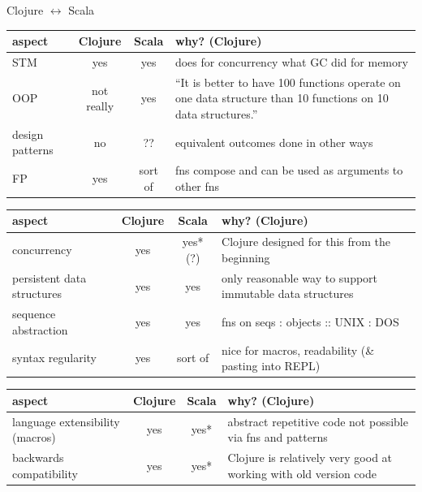 \documentclass{beamer}
\begin{document}
\begin{frame}[allowframebreaks]{Clojure $\leftrightarrow$ Scala}
  \begin{tabularx}{\linewidth}{l || c | c | X}
    aspect & Clojure & Scala & why? (Clojure)\\
    \hline
    \hline
    STM & yes & yes & does for concurrency what GC did for memory\\
    \hline
    OOP & not really & yes & ``It is better to have 100 functions
    operate on one data structure than 10 functions on 10 data
    structures.''\\
    \hline
    design patterns & no & ?? & equivalent outcomes done in other
    ways\\
    \hline
    FP & yes & sort of & fns compose and can be used as arguments to
    other fns\\
  \end{tabularx}

  \framebreak
  \begin{tabularx}{\linewidth}{X || c | c | X}
    aspect & Clojure & Scala & why? (Clojure)\\
    \hline
    \hline
    concurrency & yes & yes* (?) & Clojure designed for this from the
    beginning\\
    \hline
    persistent data structures & yes & yes & only reasonable way to
    support immutable data structures\\
    \hline
    sequence abstraction & yes & yes & fns on seqs : objects :: UNIX :
    DOS\\
    \hline
    syntax regularity & yes & sort of & nice for macros, readability
    (\& pasting into REPL)\\
    \hline
  \end{tabularx}

  \framebreak
  \begin{tabularx}{\linewidth}{X || c | c | X}
    aspect & Clojure & Scala & why? (Clojure)\\
    \hline
    \hline
    language extensibility (macros) & yes & yes* & abstract repetitive
    code not possible via fns and patterns\\
    \hline
    backwards compatibility & yes & yes* & Clojure is relatively very
    good at working with old version code\\
  \end{tabularx}
\end{frame}
\end{document}
